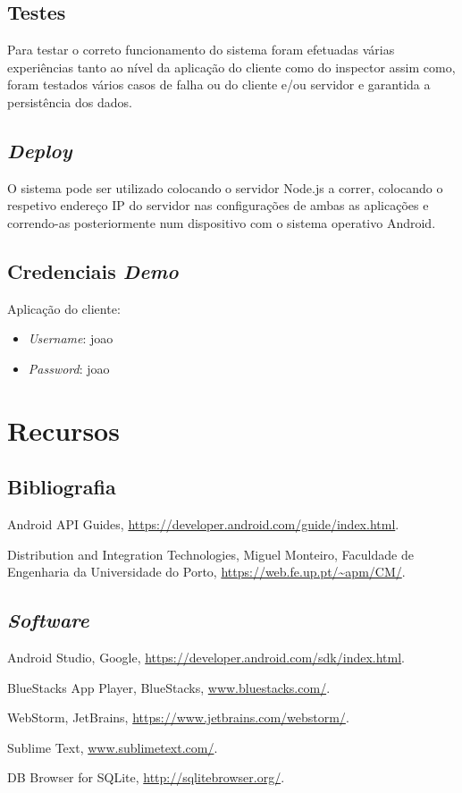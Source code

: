 \documentclass[12pt]{article}
\begin{document}
\subsection*{Testes}

Para testar o correto funcionamento do sistema foram efetuadas várias experiências tanto ao nível da aplicação do cliente como do inspector assim como, foram testados vários casos de falha ou do cliente e/ou servidor e garantida a persistência dos dados.

\subsection*{\textit{Deploy}}

O sistema pode ser utilizado colocando o servidor Node.js a correr, colocando o respetivo endereço IP do servidor nas configurações de ambas as aplicações e correndo-as posteriormente num dispositivo com o sistema operativo Android.

\subsection*{Credenciais \textit{Demo}}

Aplicação do cliente:
\begin{itemize}
\item \textit{Username}: joao
\item \textit{Password}: joao
\end{itemize}

\section{Recursos}

\subsection{Bibliografia}
\begin{description}
\item Android API Guides, \url{https://developer.android.com/guide/index.html}.
\item Distribution and Integration Technologies, Miguel Monteiro, Faculdade de Engenharia da Universidade do Porto, \url{https://web.fe.up.pt/~apm/CM/}.
\end{description}
\subsection{\it{Software}}
\begin{description}
\item Android Studio, Google, \url{https://developer.android.com/sdk/index.html}.
\item BlueStacks App Player, BlueStacks, \url{www.bluestacks.com/}.
\item WebStorm, JetBrains, \url{https://www.jetbrains.com/webstorm/}.
\item Sublime Text, \url{www.sublimetext.com/}.
\item DB Browser for SQLite, \url{http://sqlitebrowser.org/}.
\end{description}
\end{document}
